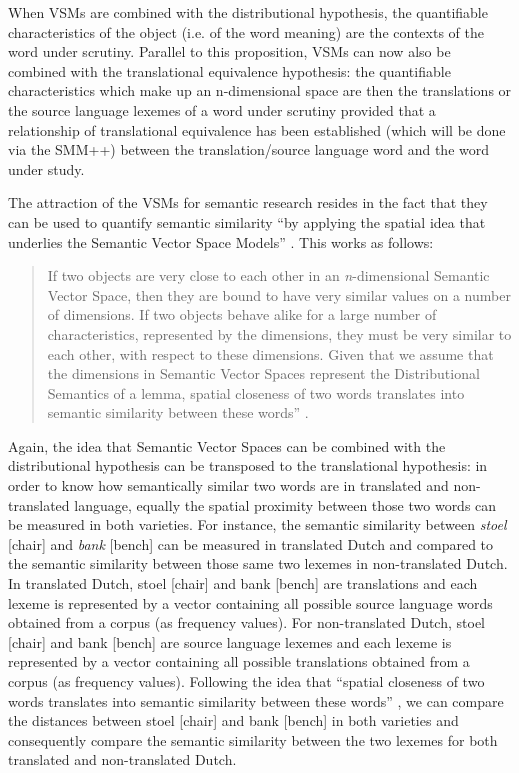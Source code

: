 When VSMs are combined with the distributional hypothesis, the quantifiable characteristics of the object (i.e. of the word meaning) are the contexts of the word under scrutiny. Parallel to this proposition, VSMs can now also be combined with the translational equivalence hypothesis: the quantifiable characteristics which make up an n-dimensional space are then the translations or the source language lexemes of a word under scrutiny provided that a relationship of translational equivalence has been established (which will be done via the SMM++) between the translation/source language word and the word under study.

The attraction of the VSMs for semantic research resides in the fact that they can be used to quantify semantic similarity “by applying the spatial idea that underlies the Semantic Vector Space Models” \citep[213]{szmrecsanyi_semantic_2014}. This works as follows:

\begin{quote}
If two objects are very close to each other in an \textit{n}{}-dimensional Semantic Vector Space, then they are bound to have very similar values on a number of dimensions. If two objects behave alike for a large number of characteristics, represented by the dimensions, they must be very similar to each other, with respect to these dimensions. Given that we assume that the dimensions in Semantic Vector Spaces represent the Distributional Semantics of a lemma, spatial closeness of two words translates into semantic similarity between these words” \citep[213]{szmrecsanyi_semantic_2014}.
\end{quote}

Again, the idea that Semantic Vector Spaces can be combined with the distributional hypothesis can be transposed to the translational hypothesis: in order to know how semantically similar two words are in translated and non-translated language, equally the spatial proximity between those two words can be measured in both varieties. For instance, the semantic similarity between \textit{stoel} [chair] and \textit{bank} [bench] can be measured in translated Dutch and compared to the semantic similarity between those same two lexemes in non-translated Dutch. In translated Dutch, stoel [chair] and bank [bench] are translations and each lexeme is represented by a vector containing all possible source language words obtained from a corpus (as frequency values). For non-translated Dutch, stoel [chair] and bank [bench] are source language lexemes and each lexeme is represented by a vector containing all possible translations obtained from a corpus (as frequency values). Following the idea that “spatial closeness of two words translates into semantic similarity between these words” \citep[213]{szmrecsanyi_semantic_2014}, we can compare the distances between stoel [chair] and bank [bench] in both varieties and consequently compare the semantic similarity between the two lexemes for both translated and non-translated Dutch. 

